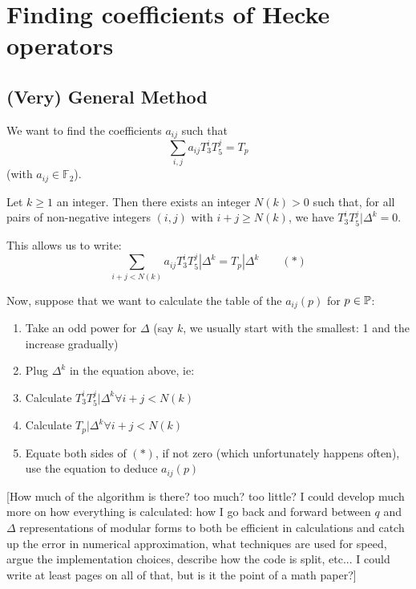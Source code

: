 \section{Finding coefficients of Hecke operators}
\subsection{(Very) General Method}
We want to find the coefficients $a_{ij}$ such that $$\sum_{i, j} a_{ij} T_3^iT_5^j = T_p$$
(with $a_{ij} \in \mathbb{F}_2$).

Let $k\geq 1$ an integer.
Then there exists an integer $N(k)>0$ such that,
for all pairs of non-negative integers $(i, j)$ with $i+j \geq N(k)$,
we have $T_3^{i}T_5^{j}|\Delta^k = 0$.

This allows us to write:
$$\sum_{i+j < N(k)} a_{ij} T_3^iT_5^j|\Delta^k= T_p|\Delta^k \qquad (*)$$

Now, suppose that we want to calculate the table of the $a_{ij}(p)$ for $p \in \mathbb{P}$:
\begin{enumerate}
    \item Take an odd power for $\Delta$ (say $k$, we usually start with the smallest: 1 and the increase gradually)
    \item Plug $\Delta^k$ in the equation above, ie:
    \item Calculate $T_3^iT_5^j|\Delta^k \forall i+j < N(k)$
    \item Calculate $T_p|\Delta^k \forall i+j < N(k)$
    \item Equate both sides of $(*)$, if not zero (which unfortunately happens often), use the equation to deduce $a_{ij}(p)$
\end{enumerate}

[How much of the algorithm is there? too much? too little? I could develop much more on how everything is calculated: how I go back and forward between $q$ and $\Delta$ representations of modular forms to both be efficient in calculations and catch up the error in numerical approximation, what techniques are used for speed, argue the implementation choices, describe how the code is split, etc... I could write at least  pages on all of that, but is it the point of a math paper?]
